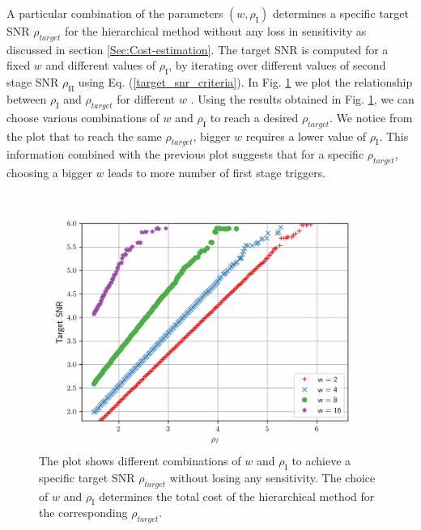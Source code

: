 A particular combination of the parameters $(w, \rho_{\text{I}})$ determines a specific target SNR $\rho_{target}$ for the hierarchical method without any loss in sensitivity as discussed in section \ref{Sec:Cost-estimation}. The target SNR is computed for a fixed $w$ and different values of $\rho_{\text{I}}$, by iterating over different values of second stage SNR $\rho_{\text{II}}$ using Eq. (\ref{target_snr_criteria}). In Fig. \ref{cutoff_vs_target} we plot the relationship between $\rho_{\text{I}}$ and $\rho_{target}$ for different $w$ . Using the results obtained in Fig. \ref{cutoff_vs_target}, we can choose various combinations of $w$ and $\rho_{\text{I}}$ to reach a desired $\rho_{target}$. We notice from the plot that to reach the same $\rho_{target}$, bigger $w$ requires a lower value of $\rho_{\text{I}}$. This information combined with the previous plot suggests that for a specific $\rho_{target}$, choosing a bigger $w$ leads to more number of first stage triggers.
\begin{figure}
    \centering
    \includegraphics[width=\linewidth]{figures/Hierarchical_MF/HIGH_cutoff_vs_target.pdf}
    \caption{ The plot shows different combinations of $w$ and $\rho_{\text{I}}$ to achieve a specific target SNR $\rho_{target}$ without losing any sensitivity. The choice of $w$ and $\rho_{\text{I}}$ determines the total cost of the hierarchical method for the corresponding $\rho_{target}$. 
   }
    \label{cutoff_vs_target}
\end{figure}

